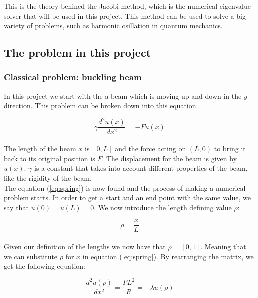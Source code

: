 \documentclass{article}
\begin{document}
This is the theory behined the Jacobi method, which is the numerical eigenvalue solver that will be used in this project. This method can be used to solve a big variety of problems, such as harmonic osillation in quantum mechanics.


\subsection{The problem in this project}


\subsubsection{Classical problem: buckling beam}


In this project we start with the a beam which is moving up and down in the $y$-direction. This problem can be broken down into this equation

\begin{equation} \label{eq:spring}
  \gamma \frac{d^2 u(x)}{dx^2} = - F u (x)
\end{equation} \\

The length of the beam $x$ is $[0,L]$ and the force acting on $(L,0)$ to bring it back to its original position is $F$. The displacement for the beam is given by $u(x)$. $\gamma$ is a constant that takes into account different properties of the beam, like the rigidity of the beam. \\

The equation (\ref{eq:spring}) is now found and the process of making a numerical problem starts. In order to get a start and an end point with the same value, we say that $u(0) = u(L) = 0$. We now introduce the length defining value $\rho$:

\begin{equation} \label{eq:rho}
  \rho = \frac{x}{L}
\end{equation} \\

Given our definition of the lengths we now have that $\rho = [0,1]$. Meaning that we can substitute $\rho$ for $x$ in equation (\ref{eq:spring}). By rearranging the matrix, we get the following equation:

\begin{equation} \label{eq:doublederivativelambdaurho}
  \frac{d^2 u(\rho)}{dx^2} = \frac{FL^2}{R} = -\lambda u(\rho)
\end{equation} \\
\end{document}
